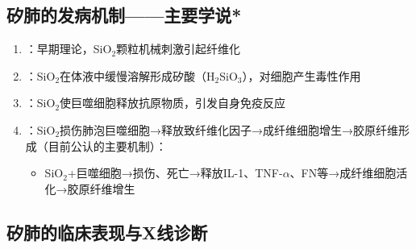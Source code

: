 \subsection{矽肺的发病机制——主要学说*}

\begin{enumerate}[leftmargin=*]
    \item {}：早期理论，SiO$_2$颗粒机械刺激引起纤维化
    \item {}：SiO$_2$在体液中缓慢溶解形成矽酸（H$_2$SiO$_3$），对细胞产生毒性作用
    \item {}：SiO$_2$使巨噬细胞释放抗原物质，引发自身免疫反应
    \item {}：SiO$_2$损伤肺泡巨噬细胞→释放致纤维化因子→成纤维细胞增生→胶原纤维形成（目前公认的主要机制）：
    \begin{itemize}
        \item SiO$_2$+巨噬细胞→损伤、死亡→释放IL-1、TNF-$\alpha$、FN等→成纤维细胞活化→胶原纤维增生
    \end{itemize}
\end{enumerate}

\subsection{矽肺的临床表现与X线诊断}

